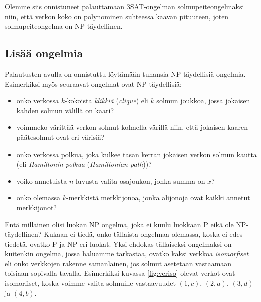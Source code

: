 Olemme siis onnistuneet palauttamaan 3SAT-ongelman solmupeiteongelmaksi
niin, että verkon koko on polynominen suhteessa kaavan pituuteen,
joten solmupeiteongelma on NP-täydellinen.

\subsection{Lisää ongelmia}

Palautusten avulla on onnistuttu löytämään tuhansia NP-täydellisiä ongelmia.
Esimerkiksi myös seuraavat ongelmat ovat NP-täydellisiä:


\begin{itemize}
\item onko verkossa $k$-kokoista \emph{klikkiä} (\emph{clique})
eli $k$ solmun joukkoa,
jossa jokaisen kahden solmun välillä on kaari?
\item voimmeko värittää verkon solmut kolmella värillä niin,
että jokaisen kaaren päätesolmut ovat eri värisiä?
\item onko verkossa polkua, joka kulkee tasan kerran jokaisen
verkon solmun kautta (eli \emph{Hamiltonin polkua} (\emph{Hamiltonian path}))?
\item voiko annetuista $n$ luvusta valita osajoukon, jonka summa on $x$?
\item onko olemassa $k$-merkkistä merkkijonoa,
jonka alijonoja ovat kaikki annetut merkkijonot?
\end{itemize}


Entä millainen olisi luokan NP ongelma, joka ei kuulu luokkaan P
eikä ole NP-täydellinen?
Kukaan ei tiedä, onko tällaista ongelmaa olemassa,
koska ei edes tiedetä, ovatko P ja NP eri luokat.
Yksi ehdokas tällaiseksi ongelmaksi on kuitenkin ongelma,
jossa haluamme tarkastaa,
ovatko kaksi verkkoa \emph{isomorfiset} eli
onko verkkojen rakenne samanlainen,
jos solmut asetetaan vastaamaan toisiaan sopivalla tavalla.
Esimerkiksi kuvassa \ref{fig:veriso} olevat verkot ovat isomorfiset,
koska voimme valita solmuille vastaavuudet $(1,c)$, $(2,a)$, $(3,d)$ ja $(4,b)$.

